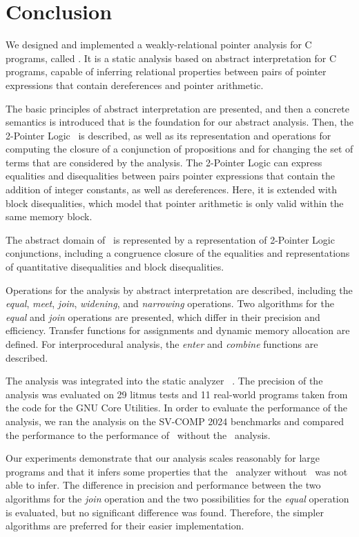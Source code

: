 \chapter{Conclusion}\label{chapter:conclusion}

We designed and implemented a weakly-relational pointer analysis for C programs, called \cpo.
It is a static analysis based on abstract interpretation for C programs,
capable of inferring relational properties between pairs of pointer expressions that contain dereferences and pointer arithmetic.

The basic principles of abstract interpretation are presented, and then a concrete semantics is introduced that is the foundation for our abstract analysis.
Then, the 2-Pointer Logic~\cite{2pointer} is described, as well as its representation and operations for computing the closure of a conjunction of propositions and for changing the set of terms that are considered by the analysis.
The 2-Pointer Logic can express equalities and disequalities between pairs pointer expressions that contain the addition of integer constants, as well as dereferences.
Here, it is extended with block disequalities, which model that pointer arithmetic is only valid within the same memory block.

The abstract domain of \cpo\ is represented by a representation of 2-Pointer Logic conjunctions, including a congruence closure of the equalities and representations of quantitative disequalities and block disequalities.

Operations for the analysis by abstract interpretation are described, including the \emph{equal}, \emph{meet}, \emph{join}, \emph{widening}, and \emph{narrowing} operations.
Two algorithms for the \emph{equal} and \emph{join} operations are presented, which differ in their precision and efficiency.
Transfer functions for assignments and dynamic memory allocation are defined.
For interprocedural analysis, the \emph{enter} and \emph{combine} functions are described.

The analysis was integrated into the static analyzer \goblint~\cite{goblint}.
The precision of the analysis was evaluated on 29 litmus tests and 11 real-world programs taken from the code for the GNU Core Utilities.
In order to evaluate the performance of the analysis, we ran the analysis on the SV-COMP 2024 benchmarks and compared the performance to the performance of \goblint\ without the \cpo\ analysis.

Our experiments demonstrate that our analysis scales reasonably for large programs and
that it infers some properties that the \goblint\ analyzer without \cpo\ was not able to infer.
The difference in precision and performance between the two algorithms for the \emph{join} operation and the two possibilities for the \emph{equal} operation is evaluated,
but no significant difference was found.
Therefore, the simpler algorithms are preferred for their easier implementation.

